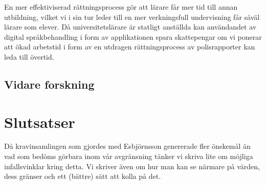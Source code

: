 \documentclass[swedish]{maucsthesis}
\begin{document}
En mer effektiviserad rättningsprocess gör att lärare får mer tid till annan utbildning, vilket vi i sin tur leder till en mer verkningsfull undervisning får såväl lärare som elever. Då universitetslärare är statligt anställda kan användandet av digital språkbehandling i form av applikationen spara skattepengar om vi ponerar att ökad arbetstid i form av en utdragen rättningsprocess av polisrapporter kan leda till övertid. 

\subsection{Vidare forskning}

\section{Slutsatser}\label{slutsatserochvidareforskning}
Då kravinsamlingen som gjordes med Esbjörnsson genererade fler önskemål än
vad som bedöms görbara inom vår avgränsning tänker vi skriva lite om möjliga
infallsvinklar kring detta.
Vi skriver även om hur man kan se närmare på värden, dess gränser och ett (bättre) sätt att kolla på det.

%
\newpage
{}




%
\end{document}
